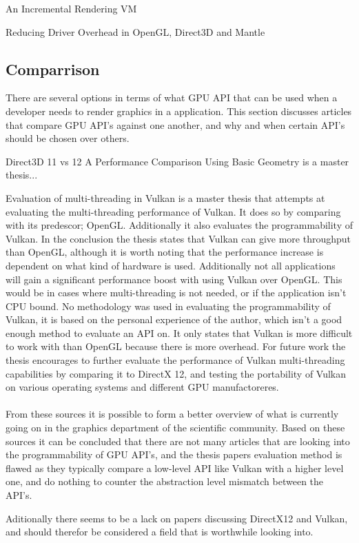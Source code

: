An Incremental Rendering VM \cite{haaser_2015_incremental} 

Reducing Driver Overhead in OpenGL, Direct3D and Mantle  \cite{dobersberger_2015_reducing}

\subsection{Comparrison}
There are several options in terms of what GPU API that can be used when a developer needs to render graphics in a application. This section discusses articles that compare GPU API's against one another, and why and when certain API's should be chosen over others.

Direct3D 11 vs 12 A Performance Comparison Using Basic Geometry \cite{2016_direct3d} is a master thesis...


Evaluation of multi-threading in Vulkan \cite{blackert_2016_evaluation} is a master thesis that attempts at evaluating the multi-threading performance of Vulkan. It does so by comparing with its predescor; OpenGL. 
Additionally it also evaluates the programmability of Vulkan. 
In the conclusion the thesis states that Vulkan can give more throughput than OpenGL, although it is worth noting that the performance increase is dependent on what kind of hardware is used. Additionally not all applications will gain a significant performance boost with using Vulkan over OpenGL. 
This would be in cases where multi-threading is not needed, or if the application isn't CPU bound. No methodology was used in evaluating the programmability of Vulkan, it is based on the personal experience of the author, which isn't a good enough method to evaluate an API on. 
It only states that Vulkan is more difficult to work with than OpenGL because there is more overhead. 
For future work the thesis encourages to further evaluate the performance of Vulkan multi-threading  capabilities by comparing it to DirectX 12, and testing the portability of Vulkan on various operating systems and different GPU manufactoreres.

\paragraph{}
From these sources it is possible to form a better overview of what is currently going on in the graphics department of the scientific community. Based on these sources it can be concluded that there are not many articles that are looking into the programmability of GPU API's, and the thesis papers evaluation method is flawed as they typically compare a low-level API like Vulkan with a higher level one, and do nothing to counter the abstraction level mismatch between the API's.

Aditionally there seems to be a lack on papers discussing DirectX12 and Vulkan, and should therefor be considered a field that is worthwhile looking into.